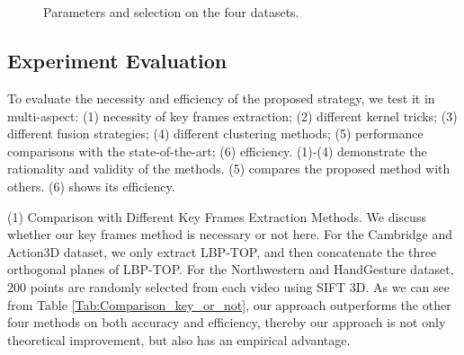 \documentclass[5p]{elsarticle}
\begin{document}
\begin{figure*}[!t]
	\begin{centering}
		\centering
		\setcounter{subfigure}{0}
		 \\
		 \\
		\caption{Parameters  and  selection on the four datasets.}
		\label{Fig:papameter}
	\end{centering}
\end{figure*}

\subsection{Experiment Evaluation}
To evaluate the necessity and efficiency of the proposed strategy, we test it in multi-aspect: (1) necessity of key frames extraction; (2) different kernel tricks; (3) different fusion strategies; (4) different clustering methods; (5) performance comparisons with the state-of-the-art; (6) efficiency.
(1)-(4) demonstrate the rationality and validity of the methods.
(5) compares the proposed method with others.
(6) shows its efficiency.

\noindent (1) Comparison with Different Key Frames Extraction Methods.
We discuss whether our key frames method is necessary or not here.
For the Cambridge and Action3D dataset, we only extract LBP-TOP, and then concatenate the three orthogonal planes of LBP-TOP.
For the Northwestern and HandGesture dataset, 200 points are randomly selected from each video using SIFT 3D.
As we can see from Table \ref{Tab:Comparison_key_or_not}, our approach outperforms the other four methods on both accuracy and efficiency, thereby our approach is not only theoretical improvement, but also has an empirical advantage.
\end{document}
